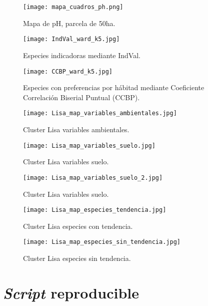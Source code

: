 \documentclass[11pt,]{article}
\begin{document}
\begin{figure}
\centering
\texttt{[image: mapa\_cuadros\_ph.png]}
\caption{Mapa de pH, parcela de 50ha. \label{fig:mapa_cuadros_pH}}
\end{figure}

\begin{figure}
\centering
\texttt{[image: IndVal\_ward\_k5.jpg]}
\caption{Especies indicadoras mediante IndVal.
\label{fig:IndVal_ward_k5}}
\end{figure}

\begin{figure}
\centering
\texttt{[image: CCBP\_ward\_k5.jpg]}
\caption{Especies con preferencias por hábitad mediante Coeficiente
Correlación Biserial Puntual (CCBP). \label{fig:CCBP_ward_k5}}
\end{figure}

\begin{figure}
\centering
\texttt{[image: Lisa\_map\_variables\_ambientales.jpg]}
\caption{Cluster Lisa variables ambientales.
\label{fig:Lisa_map_variables_ambientales}}
\end{figure}

\begin{figure}
\centering
\texttt{[image: Lisa\_map\_variables\_suelo.jpg]}
\caption{Cluster Lisa variables suelo.
\label{fig:Lisa_map_variables_suelo}}
\end{figure}

\begin{figure}
\centering
\texttt{[image: Lisa\_map\_variables\_suelo\_2.jpg]}
\caption{Cluster Lisa variables suelo.
\label{fig:Lisa_map_variables_suelo_2}}
\end{figure}

\begin{figure}
\centering
\texttt{[image: Lisa\_map\_especies\_tendencia.jpg]}
\caption{Cluster Lisa especies con tendencia.
\label{fig:Lisa_map_especies_tendencia}}
\end{figure}

\begin{figure}
\centering
\texttt{[image: Lisa\_map\_especies\_sin\_tendencia.jpg]}
\caption{Cluster Lisa especies sin tendencia.
\label{fig:Lisa_map_especies_sin_tendencia}}
\end{figure}

\section{\texorpdfstring{\emph{Script}
reproducible}{Script reproducible}}\label{script-reproducible}
\end{document}
